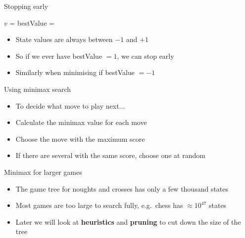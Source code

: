 \begin{frame}{Stopping early}
	\begin{algorithmic}
			\State $v$ = 
			\State bestValue =  
		\EndFor
	\end{algorithmic}
	\begin{itemize}
		\pause\item State values are always between $-1$ and $+1$
		\pause\item So if we ever have bestValue $= 1$, we can stop early
		\pause\item Similarly when minimising if bestValue $= -1$
	\end{itemize}
\end{frame}

\begin{frame}{Using minimax search}
	\begin{itemize}
		\pause\item To decide what move to play next...
		\pause\item Calculate the minimax value for each move
		\pause\item Choose the move with the maximum score
		\pause\item If there are several with the same score, choose one at random
	\end{itemize}
\end{frame}

\begin{frame}{Minimax for larger games}
	\begin{itemize}
		\pause\item The game tree for noughts and crosses has only a few thousand states
		\pause\item Most games are too large to search fully, e.g.\ chess has $\approx 10^{47}$ states
		\pause\item Later we will look at \textbf{heuristics} and \textbf{pruning}
			to cut down the size of the tree
	\end{itemize}
\end{frame}

